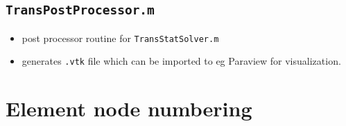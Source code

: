 \documentclass[12pt]{article}
\begin{document}
\subsection{\texttt{TransPostProcessor.m} 
}
\begin{itemize}
\item post processor routine for \verb|TransStatSolver.m|
\item generates \verb|.vtk| file which can be imported to eg Paraview for visualization.
\end{itemize}


\section{Element node numbering}
\end{document}

